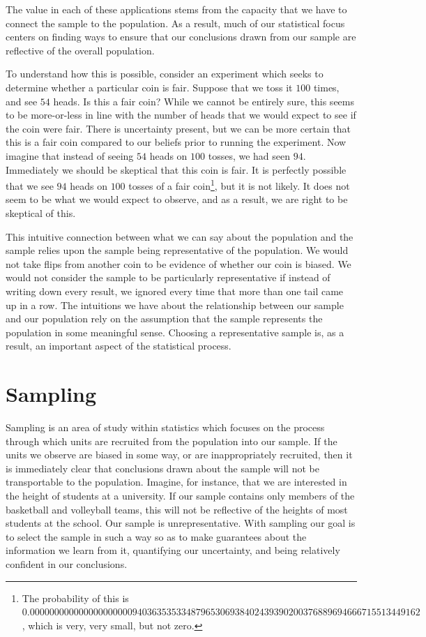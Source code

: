 \documentclass[
  letterpaper,
  DIV=11,
  numbers=noendperiod]{scrreprt}
\theoremstyle{definition}
\theoremstyle{definition}
\theoremstyle{definition}
\theoremstyle{remark}
\begin{document}
The value in each of these applications stems from the capacity that we
have to connect the sample to the population. As a result, much of our
statistical focus centers on finding ways to ensure that our conclusions
drawn from our sample are reflective of the overall population.

To understand how this is possible, consider an experiment which seeks
to determine whether a particular coin is fair. Suppose that we toss it
\(100\) times, and see \(54\) heads. Is this a fair coin? While we
cannot be entirely sure, this seems to be more-or-less in line with the
number of heads that we would expect to see if the coin were fair. There
is uncertainty present, but we can be more certain that this is a fair
coin compared to our beliefs prior to running the experiment. Now
imagine that instead of seeing \(54\) heads on \(100\) tosses, we had
seen \(94\). Immediately we should be skeptical that this coin is fair.
It is perfectly possible that we see \(94\) heads on \(100\) tosses of a
fair coin\footnote{The probability of this is
  \(0.00000000000000000000094036353533487965306938402439390200376889694666715513449162\),
  which is very, very small, but not zero.}, but it is not likely. It
does not seem to be what we would expect to observe, and as a result, we
are right to be skeptical of this.

This intuitive connection between what we can say about the population
and the sample relies upon the sample being representative of the
population. We would not take flips from another coin to be evidence of
whether our coin is biased. We would not consider the sample to be
particularly representative if instead of writing down every result, we
ignored every time that more than one tail came up in a row. The
intuitions we have about the relationship between our sample and our
population rely on the assumption that the sample represents the
population in some meaningful sense. Choosing a representative sample
is, as a result, an important aspect of the statistical process.

\section{Sampling}\label{sampling}

Sampling is an area of study within statistics which focuses on the
process through which units are recruited from the population into our
sample. If the units we observe are biased in some way, or are
inappropriately recruited, then it is immediately clear that conclusions
drawn about the sample will not be transportable to the population.
Imagine, for instance, that we are interested in the height of students
at a university. If our sample contains only members of the basketball
and volleyball teams, this will not be reflective of the heights of most
students at the school. Our sample is unrepresentative. With sampling
our goal is to select the sample in such a way so as to make guarantees
about the information we learn from it, quantifying our uncertainty, and
being relatively confident in our conclusions.
\end{document}
